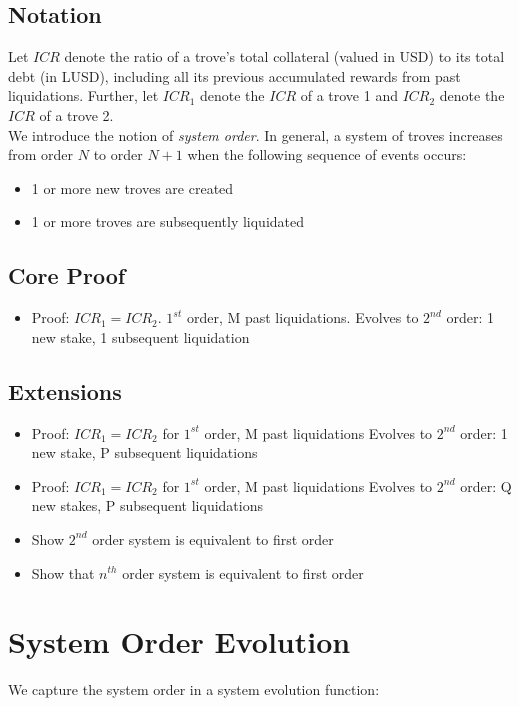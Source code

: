 \documentclass[reqno]{article}
\begin{document}
\subsection*{Notation}
Let $ICR$ denote the ratio of a trove's total collateral (valued in USD) to its total debt (in LUSD), including all its previous accumulated rewards from past liquidations. Further, let $ICR_1$ denote the $ICR$ of a trove 1 and $ICR_2$ denote the $ICR$ of a trove 2. \\

We introduce the notion of \textit{system order}. In general, a system of troves increases from order $N$ to order $N+1$ when the following sequence of events occurs:

\begin{itemize}
  \item 1 or more new troves are created 
  \item 1 or more troves are subsequently liquidated
\end{itemize}

\subsection*{Core Proof}
\begin{itemize}
  \item Proof: $ICR_1=ICR_2$. $1^{st}$ order, M past liquidations. Evolves to $2^{nd}$ order: 1 new stake, 1 subsequent liquidation
\end{itemize}


\subsection*{Extensions}
\begin{itemize}
  \item Proof: $ICR_1=ICR_2$ for $1^{st}$ order, M past liquidations Evolves to $2^{nd}$ order: 1 new stake, P subsequent liquidations
  \item Proof: $ICR_1=ICR_2$ for $1^{st}$ order, M past liquidations Evolves to $2^{nd}$ order: Q new stakes, P subsequent liquidations
  \item Show $2^{nd}$ order system is equivalent to first order 
  \item Show that $n^{th}$ order system is equivalent to first order
\end{itemize}


\section{System Order Evolution}
We capture the system order in a system evolution function:
\end{document}
